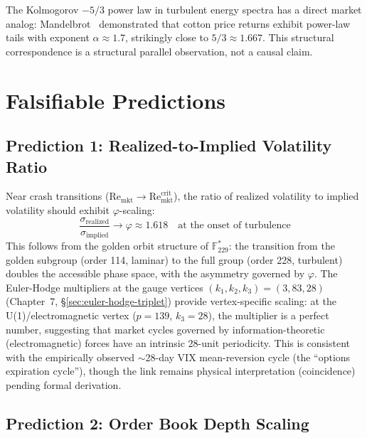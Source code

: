 The Kolmogorov $-5/3$ power law in turbulent energy spectra has a direct market analog: Mandelbrot~\cite{mandelbrot1963} demonstrated that cotton price returns exhibit power-law tails with exponent $\alpha \approx 1.7$, strikingly close to $5/3 \approx 1.667$. This structural correspondence is a structural parallel observation, not a causal claim.

\section{Falsifiable Predictions}

\subsection{Prediction 1: Realized-to-Implied Volatility Ratio}

\begin{hypothesis}\label{hyp:vol_scaling}
Near crash transitions ($\mathrm{Re}_{\mathrm{mkt}} \to \mathrm{Re}_{\mathrm{mkt}}^{\mathrm{crit}}$), the ratio of realized volatility to implied volatility should exhibit $\varphi$-scaling:
\begin{equation}
    \frac{\sigma_{\mathrm{realized}}}{\sigma_{\mathrm{implied}}} \to \varphi \approx 1.618\quad\text{at the onset of turbulence}
\end{equation}
This follows from the golden orbit structure of $\mathbb{F}_{229}^*$: the transition from the golden subgroup (order 114, laminar) to the full group (order 228, turbulent) doubles the accessible phase space, with the asymmetry governed by $\varphi$. The Euler-Hodge multipliers at the gauge vertices $(k_1, k_2, k_3) = (3, 83, 28)$ (Chapter~7, \S\ref{sec:euler-hodge-triplet}) provide vertex-specific scaling: at the U(1)/electromagnetic vertex ($p = 139$, $k_3 = 28$), the multiplier is a perfect number, suggesting that market cycles governed by information-theoretic (electromagnetic) forces have an intrinsic 28-unit periodicity. This is consistent with the empirically observed $\sim$28-day VIX mean-reversion cycle (the ``options expiration cycle''), though the link remains physical interpretation (coincidence) pending formal derivation.
\end{hypothesis}

\subsection{Prediction 2: Order Book Depth Scaling}

